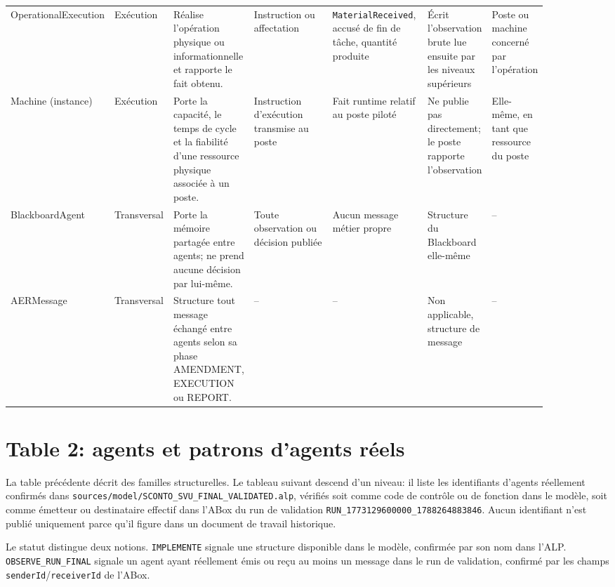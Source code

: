 \begin{landscape}
{\begin{longtable}{L{0.10\linewidth} L{0.08\linewidth} L{0.15\linewidth} L{0.18\linewidth} L{0.18\linewidth} L{0.10\linewidth} L{0.10\linewidth}}
Operational\-Execution & Exécution & Réalise l'opération physique ou informationnelle et rapporte le fait obtenu. & Instruction ou affectation & \texttt{Material\allowbreak Received}, accusé de fin de tâche, quantité produite & Écrit l'observation brute lue ensuite par les niveaux supérieurs & Poste ou machine concerné par l'opération \\

Machine (instance) & Exécution & Porte la capacité, le temps de cycle et la fiabilité d'une ressource physique associée à un poste. & Instruction d'exécution transmise au poste & Fait runtime relatif au poste piloté & Ne publie pas directement; le poste rapporte l'observation & Elle-même, en tant que ressource du poste \\

BlackboardAgent & Transversal & Porte la mémoire partagée entre agents; ne prend aucune décision par lui-même. & Toute observation ou décision publiée & Aucun message métier propre & Structure du Blackboard elle-même & -- \\

AERMessage & Transversal & Structure tout message échangé entre agents selon sa phase AMENDMENT, EXECUTION ou REPORT. & -- & -- & Non applicable, structure de message & -- \\

\end{longtable}
}
\end{landscape}

\section{Table 2: agents et patrons d'agents réels}

La table précédente décrit des familles structurelles. Le tableau suivant descend d'un niveau: il liste les identifiants d'agents réellement confirmés dans \texttt{sources/model/SCONTO\_\allowbreak SVU\_\allowbreak FINAL\_\allowbreak VALIDATED.alp}, vérifiés soit comme code de contrôle ou de fonction dans le modèle, soit comme émetteur ou destinataire effectif dans l'ABox du run de validation \texttt{RUN\_1773129600000\_1788264883846}. Aucun identifiant n'est publié uniquement parce qu'il figure dans un document de travail historique.

Le statut distingue deux notions. \texttt{IMPLEMENTE} signale une structure disponible dans le modèle, confirmée par son nom dans l'ALP. \texttt{OBSERVE\_\allowbreak RUN\_\allowbreak FINAL} signale un agent ayant réellement émis ou reçu au moins un message dans le run de validation, confirmé par les champs \texttt{sender\allowbreak Id}/\texttt{receiver\allowbreak Id} de l'ABox.

